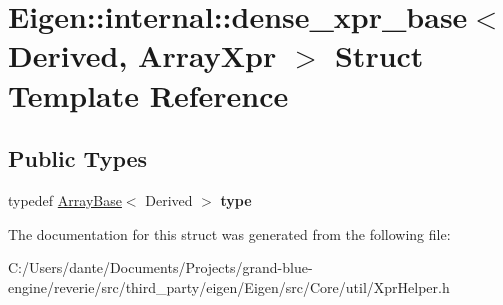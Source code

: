 \hypertarget{struct_eigen_1_1internal_1_1dense__xpr__base_3_01_derived_00_01_array_xpr_01_4}{}\section{Eigen\+::internal\+::dense\+\_\+xpr\+\_\+base$<$ Derived, Array\+Xpr $>$ Struct Template Reference}
\label{struct_eigen_1_1internal_1_1dense__xpr__base_3_01_derived_00_01_array_xpr_01_4}
\subsection*{Public Types}
\begin{DoxyCompactItemize}
\item 
\mbox{\label{struct_eigen_1_1internal_1_1dense__xpr__base_3_01_derived_00_01_array_xpr_01_4_a49f2e9d731521e50359b783cb87b63c7}} 
typedef \mbox{\hyperlink{class_eigen_1_1_array_base}{Array\+Base}}$<$ Derived $>$ {\bfseries type}
\end{DoxyCompactItemize}


The documentation for this struct was generated from the following file\+:\begin{DoxyCompactItemize}
\item 
C\+:/\+Users/dante/\+Documents/\+Projects/grand-\/blue-\/engine/reverie/src/third\+\_\+party/eigen/\+Eigen/src/\+Core/util/Xpr\+Helper.\+h\end{DoxyCompactItemize}
